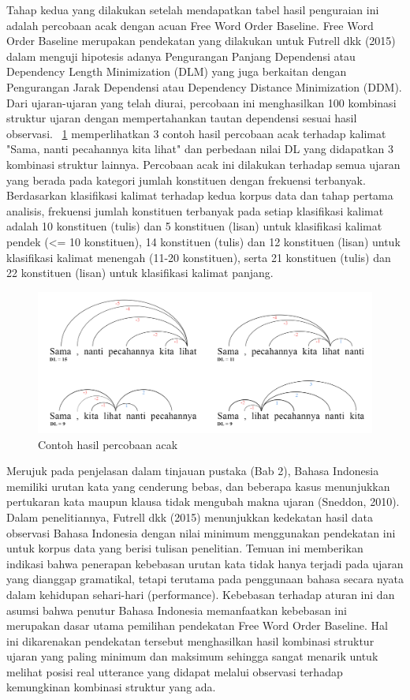 Tahap kedua yang dilakukan setelah mendapatkan tabel hasil penguraian ini adalah percobaan acak dengan acuan Free Word Order Baseline. Free Word Order Baseline merupakan pendekatan yang dilakukan untuk Futrell dkk (2015) dalam menguji hipotesis adanya Pengurangan Panjang Dependensi atau Dependency Length Minimization (DLM) yang juga berkaitan dengan Pengurangan Jarak Dependensi atau Dependency Distance Minimization (DDM). Dari ujaran-ujaran yang telah diurai, percobaan ini menghasilkan 100 kombinasi struktur ujaran dengan mempertahankan tautan dependensi sesuai hasil observasi. \pic~\ref{fig:percobaan_acak} memperlihatkan 3 contoh hasil percobaan acak terhadap kalimat "Sama, nanti pecahannya kita lihat" dan perbedaan nilai DL yang didapatkan 3 kombinasi struktur lainnya. Percobaan acak ini dilakukan terhadap semua ujaran yang berada pada kategori jumlah konstituen dengan frekuensi terbanyak. Berdasarkan klasifikasi kalimat terhadap kedua korpus data dan tahap pertama analisis, frekuensi jumlah konstituen terbanyak pada setiap klasifikasi kalimat adalah 10 konstituen (tulis) dan 5 konstituen (lisan) untuk klasifikasi kalimat pendek (\textless= 10 konstituen), 14 konstituen (tulis) dan 12 konstituen (lisan) untuk klasifikasi kalimat menengah (11-20 konstituen), serta 21 konstituen (tulis) dan 22 konstituen (lisan) untuk klasifikasi kalimat panjang. 

\begin{figure}
	\centering \includegraphics[width=1
	\textwidth] {pics/percobaan_acak.jpg} 
	\caption{Contoh hasil percobaan acak} 
\label{fig:percobaan_acak} 
\end{figure}

Merujuk pada penjelasan dalam tinjauan pustaka (Bab 2), Bahasa Indonesia memiliki urutan kata yang cenderung bebas, dan beberapa kasus menunjukkan pertukaran kata maupun klausa tidak mengubah makna ujaran (Sneddon, 2010). Dalam penelitiannya, Futrell dkk (2015) menunjukkan kedekatan hasil data observasi Bahasa Indonesia dengan nilai minimum menggunakan pendekatan ini untuk korpus data yang berisi tulisan penelitian. Temuan ini memberikan indikasi bahwa penerapan kebebasan urutan kata tidak hanya terjadi pada ujaran yang dianggap gramatikal, tetapi terutama pada penggunaan bahasa secara nyata dalam kehidupan sehari-hari (performance). Kebebasan terhadap aturan ini dan asumsi bahwa penutur Bahasa Indonesia memanfaatkan kebebasan ini merupakan dasar utama pemilihan pendekatan Free Word Order Baseline. Hal ini dikarenakan pendekatan tersebut menghasilkan hasil kombinasi struktur ujaran yang paling minimum dan maksimum sehingga sangat menarik untuk melihat posisi real utterance yang didapat melalui observasi terhadap kemungkinan kombinasi struktur yang ada. 

